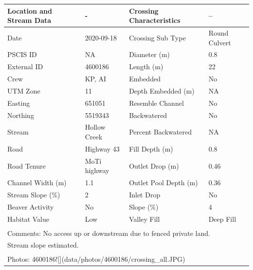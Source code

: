 \documentclass[
]{book}
\begin{document}
\begin{tabular}{l|l|l|l}
\hline
Location and Stream Data & - & Crossing Characteristics & --\\
\hline
Date & 2020-09-18 & Crossing Sub Type & Round Culvert\\
\hline
PSCIS ID & NA & Diameter (m) & 0.8\\
\hline
External ID & 4600186 & Length (m) & 22\\
\hline
Crew & KP, AI & Embedded & No\\
\hline
UTM Zone & 11 & Depth Embedded (m) & NA\\
\hline
Easting & 651051 & Resemble Channel & No\\
\hline
Northing & 5519343 & Backwatered & No\\
\hline
Stream & Hollow Creek & Percent Backwatered & NA\\
\hline
Road & Highway 43 & Fill Depth (m) & 0.8\\
\hline
Road Tenure & MoTi highway & Outlet Drop (m) & 0.46\\
\hline
Channel Width (m) & 1.1 & Outlet Pool Depth (m) & 0.36\\
\hline
Stream Slope (\%) & 2 & Inlet Drop & No\\
\hline
Beaver Activity & No & Slope (\%) & 4\\
\hline
Habitat Value & Low & Valley Fill & Deep Fill\\
\hline
\multicolumn{4}{l}{\textsuperscript{} Comments: No access up or downstream due to fenced private land.}\\
\multicolumn{4}{l}{Stream slope estimated.}\\
\multicolumn{4}{l}{\textsuperscript{} Photos: 4600186![](data/photos/4600186/crossing\_all.JPG)}\\
\end{tabular}
\end{document}
